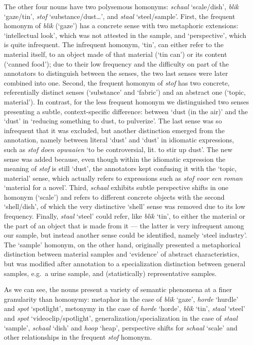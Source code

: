 \documentclass[
]{book}
\begin{document}
The other four nouns have two polysemous homonyms: \emph{schaal} `scale/dish', \emph{blik} `gaze/tin', \emph{stof} `substance/dust\ldots{}', and \emph{staal} `steel/sample'.
First, the frequent homonym of \emph{blik} (`gaze') has a concrete sense with two metaphoric extensions: `intellectual look', which was not attested in the sample, and `perspective', which is quite infrequent. The infrequent homonym, `tin', can either refer to the material itself, to an object made of that material (`tin can') or its content (`canned food'); due to their low frequency and the difficulty on part of the annotators to distinguish between the senses, the two last senses were later combined into one.
Second, the frequent homonym of \emph{stof} has two concrete, referentially distinct senses (`substance' and `fabric') and an abstract one (`topic, material'). In contrast, for the less frequent homonym we distinguished two senses presenting a subtle, context-specific difference: between `dust (in the air)' and the `dust' in `reducing something to dust, to pulverize'. The last sense was so infrequent that it was excluded, but another distinction emerged from the annotation, namely between literal `dust' and `dust' in idiomatic expressions, such as \emph{stof doen opwaaien} `to be controversial, lit. to stir up dust'. The new sense was added because, even though within the idiomatic expression the meaning of \emph{stof} is still `dust', the annotators kept confusing it with the `topic, material' sense, which actually refers to expressions such as \emph{stof voor een roman} `material for a novel'.
Third, \emph{schaal} exhibits subtle perspective shifts in one homonym (`scale') and refers to different concrete objects with the second `shell/dish', of which the very distinctive `shell' sense was removed due to its low frequency.
Finally, \emph{staal} `steel' could refer, like \emph{blik} `tin', to either the material or the part of an object that is made from it --- the latter is very infrequent among our sample, but instead another sense could be identified, namely `steel industry'. The `sample' homonym, on the other hand, originally presented a metaphorical distinction between material samples and `evidence' of abstract characteristics, but was modified after annotation to a specialization distinction between general samples, e.g.~a urine sample, and (statistically) representative samples.

As we can see, the nouns present a variety of semantic phenomena at a finer granularity than homonymy: metaphor in the case of \emph{blik} `gaze', \emph{horde} `hurdle' and \emph{spot} `spotlight', metonymy in the case of \emph{horde} `horde', \emph{blik} `tin', \emph{staal} `steel' and \emph{spot} `videoclip/spotlight', generalization/specialization in the case of \emph{staal} `sample', \emph{schaal} `dish' and \emph{hoop} `heap', perspective shifts for \emph{schaal} `scale' and other relationships in the frequent \emph{stof} homonym.
\end{document}
